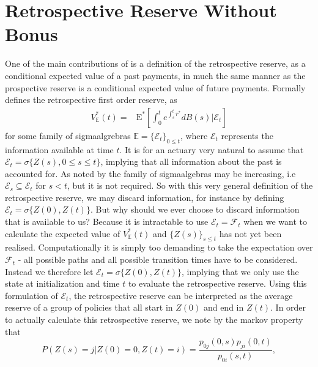 \documentclass[12pt]{article}
\newcommand{\E}{\text{E}}
\newcommand{\indic}[1]{\mathds{1}_{ \{ #1 \} }}
\theoremstyle{my_thm}
\begin{document}
\section{Retrospective Reserve Without Bonus} \label{sec:Nor}
One of the main contributions of \citet{Norberg} is a definition of the retrospective reserve, as a conditional expected value of a past payments, in much the same manner as the prospective reserve is a conditional expected value of future payments. Formally \citet{Norberg} defines the retrospective first order reserve, as
\begin{align*}
V^*_\mathbb{E}(t)=&\E^* \left[ \int_0^t e^{\int_s^t r^*} dB(s) \big| \mathcal{E}_t \right] 
\end{align*} 
for some family of sigmaalgrebras $\mathbb{E}=\{\mathcal{E}_t \}_{0\leq t}$, where $\mathcal{E}_t$ represents the information available at time $t$. It is for an actuary very natural to assume that $\mathcal{E}_t=\sigma\{ Z(s), 0 \leq s\leq t \}$, implying that all information about the past is accounted for. As noted by \citet{Norberg} the family of sigmaalgebras may be increasing, i.e $\mathcal{E}_s \subseteq \mathcal{E}_t$ for $s<t$, but it is not required. So with this very general definition of the retrospective reserve, we may discard information, for instance by defining $\mathcal{E}_t=\sigma \{Z(0), Z(t) \}$. But why should we ever choose to discard information that is available to us? Because it is intractable to use $\mathcal{E}_t=\mathcal{F}_t$ when we want to calculate the expected value of $V^*_\mathbb{E}(t)$ and $\{ Z(s) \}_{s\leq t}$ has not yet been realised. Computationally it is simply too demanding to take the expectation over $\mathcal{F}_t$ - all possible paths and all possible transition times have to be considered. Instead we therefore let $\mathcal{E}_t=\sigma \{Z(0), Z(t) \}$, implying that we only use the state at initialization and time $t$ to evaluate the retrospective reserve. Using this formulation of $\mathcal{E}_t$, the retrospective reserve can be interpreted as the average reserve of a group of policies that all start in $Z(0)$ and end in $Z(t)$. In order to actually calculate this retrospective reserve, we note by the markov property that
\begin{equation}
P(Z(s)=j| Z(0)=0, Z(t)=i )=\frac{p_{0j}(0,s)p_{ji}(0,t)}{p_{0i}(s,t)},
\label{eq:AAM}
\end{equation}
\end{document}
